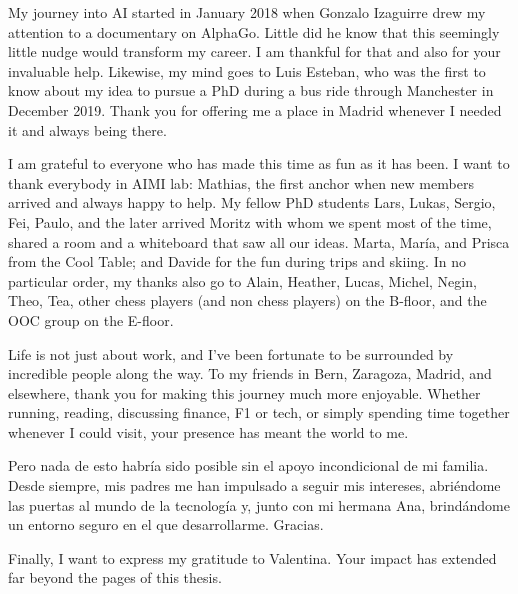 My journey into AI started in January 2018 when Gonzalo Izaguirre drew my attention to a documentary on AlphaGo. Little did he know that this seemingly little nudge would transform my career. I am thankful for that and also for your invaluable help. Likewise, my mind goes to Luis Esteban, who was the first to know about my idea to pursue a PhD during a bus ride through Manchester in December 2019. Thank you for offering me a place in Madrid whenever I needed it and always being there.

I am grateful to everyone who has made this time as fun as it has been. I want to thank everybody in AIMI lab: Mathias, the first anchor when new members arrived and always happy to help. My fellow PhD students Lars, Lukas, Sergio, Fei, Paulo, and the later arrived Moritz with whom we spent most of the time, shared a room and a whiteboard that saw all our ideas. Marta, María, and Prisca from the Cool Table; and Davide for the fun during trips and skiing. In no particular order, my thanks also go to Alain, Heather, Lucas, Michel, Negin, Theo, Tea, other chess players (and non chess players) on the B-floor, and the OOC group on the E-floor.

Life is not just about work, and I’ve been fortunate to be surrounded by incredible people along the way. To my friends in Bern, Zaragoza, Madrid, and elsewhere, thank you for making this journey much more enjoyable. Whether running, reading, discussing finance, F1 or tech, or simply spending time together whenever I could visit, your presence has meant the world to me.

Pero nada de esto habría sido posible sin el apoyo incondicional de mi familia. Desde siempre, mis padres me han impulsado a seguir mis intereses, abriéndome las puertas al mundo de la tecnología y, junto con mi hermana Ana, brindándome un entorno seguro en el que desarrollarme. Gracias. 

Finally, I want to express my gratitude to Valentina. Your impact has extended far beyond the pages of this thesis.